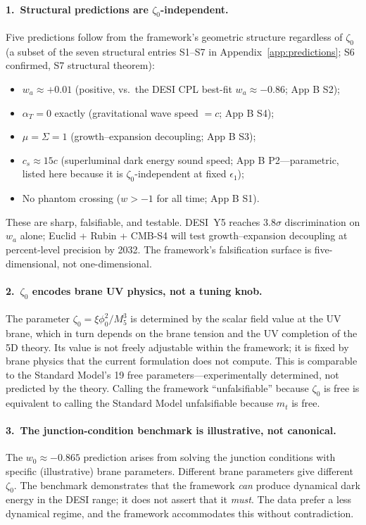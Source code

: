 \paragraph{1.\ Structural predictions are $\zeta_0$-independent.} Five predictions follow from the framework's geometric structure regardless of $\zeta_0$ (a subset of the seven structural entries S1--S7 in Appendix~\ref{app:predictions}; S6 confirmed, S7 structural theorem):
\begin{itemize}
\item $w_a \approx +0.01$ (positive, vs.\ the DESI CPL best-fit $w_a \approx -0.86$; App B S2);
\item $\alpha_T = 0$ exactly (gravitational wave speed $= c$; App B S4);
\item $\mu = \Sigma = 1$ (growth--expansion decoupling; App B S3);
\item $c_s \approx 15c$ (superluminal dark energy sound speed; App B P2---parametric, listed here because it is $\zeta_0$-independent at fixed $\epsilon_1$);
\item No phantom crossing ($w > -1$ for all time; App B S1).
\end{itemize}
These are sharp, falsifiable, and testable. DESI~Y5 reaches $3.8\sigma$ discrimination on $w_a$ alone; Euclid + Rubin + CMB-S4 will test growth--expansion decoupling at percent-level precision by 2032. The framework's falsification surface is five-dimensional, not one-dimensional.

\paragraph{2.\ $\zeta_0$ encodes brane UV physics, not a tuning knob.} The parameter $\zeta_0 = \xi\phi_0^2/M_5^3$ is determined by the scalar field value at the UV brane, which in turn depends on the brane tension and the UV completion of the 5D theory. Its value is not freely adjustable within the framework; it is fixed by brane physics that the current formulation does not compute. This is comparable to the Standard Model's 19 free parameters---experimentally determined, not predicted by the theory. Calling the framework ``unfalsifiable'' because $\zeta_0$ is free is equivalent to calling the Standard Model unfalsifiable because $m_t$ is free.

\paragraph{3.\ The junction-condition benchmark is illustrative, not canonical.} The $w_0 \approx -0.865$ prediction arises from solving the junction conditions with specific (illustrative) brane parameters. Different brane parameters give different $\zeta_0$. The benchmark demonstrates that the framework \emph{can} produce dynamical dark energy in the DESI range; it does not assert that it \emph{must}. The data prefer a less dynamical regime, and the framework accommodates this without contradiction.

